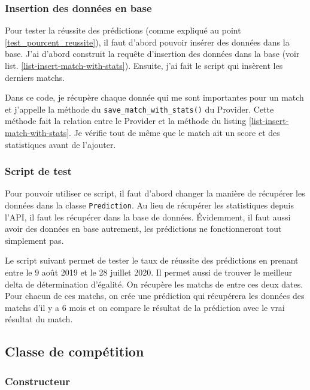 \documentclass[a4paper,14pt]{extarticle}
\begin{document}
{\subsubsection{Insertion des données en base}

Pour tester la réussite des prédictions (comme expliqué au point \ref{test_pourcent_reussite}), il faut d'abord pouvoir insérer des données dans la base. J'ai d'abord construit la requête d'insertion des données dans la base (voir list. \ref{list-insert-match-with-stats}). Ensuite, j'ai fait le script qui insèrent les derniers matchs.


Dans ce code, je récupère chaque donnée qui me sont importantes pour un match et j'appelle la méthode du \texttt{save\_match\_with\_stats()} du Provider. Cette méthode fait la relation entre le Provider et la méthode du listing \ref{list-insert-match-with-stats}. Je vérifie tout de même que le match ait un score et des statistiques avant de l'ajouter.

\subsubsection{Script de test}
Pour pouvoir utiliser ce script, il faut d'abord changer la manière de récupérer les données dans la classe \texttt{Prediction}. Au lieu de récupérer les statistiques depuis l'API, il faut les récupérer dans la base de données. Évidemment, il faut aussi avoir des données en base autrement, les prédictions ne fonctionneront tout simplement pas.

Le script suivant permet de tester le taux de réussite des prédictions en prenant entre le 9 août 2019 et le 28 juillet 2020. Il permet aussi de trouver le meilleur delta de détermination d'égalité. On récupère les matchs de entre ces deux dates. Pour chacun de ces matchs, on crée une prédiction qui récupérera les données des matchs d'il y a 6 mois et on compare le résultat de la prédiction avec le vrai résultat du match.


\subsection{Classe de compétition}

\subsubsection{Constructeur}

}
\end{document}
